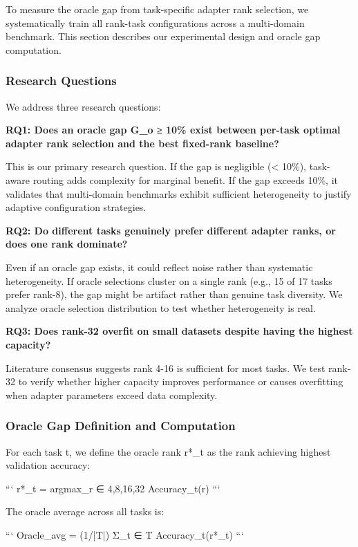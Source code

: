 
To measure the oracle gap from task-specific adapter rank selection, we systematically train all rank-task configurations across a multi-domain benchmark. This section describes our experimental design and oracle gap computation.

\subsubsection{Research Questions}

We address three research questions:

\textbf{RQ1: Does an oracle gap G_o ≥ 10\% exist between per-task optimal adapter rank selection and the best fixed-rank baseline?}

This is our primary research question. If the gap is negligible (< 10\%), task-aware routing adds complexity for marginal benefit. If the gap exceeds 10\%, it validates that multi-domain benchmarks exhibit sufficient heterogeneity to justify adaptive configuration strategies.

\textbf{RQ2: Do different tasks genuinely prefer different adapter ranks, or does one rank dominate?}

Even if an oracle gap exists, it could reflect noise rather than systematic heterogeneity. If oracle selections cluster on a single rank (e.g., 15 of 17 tasks prefer rank-8), the gap might be artifact rather than genuine task diversity. We analyze oracle selection distribution to test whether heterogeneity is real.

\textbf{RQ3: Does rank-32 overfit on small datasets despite having the highest capacity?}

Literature consensus suggests rank 4-16 is sufficient for most tasks. We test rank-32 to verify whether higher capacity improves performance or causes overfitting when adapter parameters exceed data complexity.

\subsubsection{Oracle Gap Definition and Computation}

For each task t, we define the oracle rank r*_t as the rank achieving highest validation accuracy:

```
r*_t = argmax_{r ∈ {4,8,16,32}} Accuracy_t(r)
```

The oracle average across all tasks is:

```
Oracle_avg = (1/|T|) Σ_{t ∈ T} Accuracy_t(r*_t)
```

